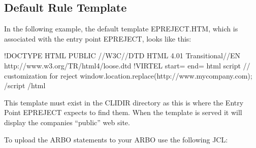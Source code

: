 \documentclass[letterpaper,10pt,english]{sphinxmanual}
\begin{document}
\ignorespaces 

\subsection{Default Rule Template}
\label{\detokenize{connectivity_guide:default-rule-template}}\label{\detokenize{connectivity_guide:index-196}}
\sphinxAtStartPar
In the following example, the default template EPREJECT.HTM, which is associated with the entry point EPREJECT, looks like this:\sphinxhyphen{}

\begin{sphinxVerbatim}[commandchars=\\\{\}]
\PYGZlt{}!DOCTYPE HTML PUBLIC \PYGZdq{}\PYGZhy{}//W3C//DTD HTML 4.01 Transitional//EN\PYGZdq{}
\PYGZdq{}http://www.w3.org/TR/html4/loose.dtd\PYGZdq{}\PYGZgt{}
\PYGZlt{}!\PYGZhy{}\PYGZhy{}VIRTEL start=\PYGZdq{}\PYGZob{}\PYGZob{}\PYGZob{}\PYGZdq{} end=\PYGZdq{}\PYGZcb{}\PYGZcb{}\PYGZcb{}\PYGZdq{} \PYGZhy{}\PYGZhy{}\PYGZgt{}
\PYGZlt{}html\PYGZgt{}
\PYGZlt{}script\PYGZgt{}
// customization for reject
window.location.replace(\PYGZdq{}http://www.mycompany.com\PYGZdq{});
\PYGZlt{}/script\PYGZgt{}
\PYGZlt{}/html\PYGZgt{}
\end{sphinxVerbatim}

\sphinxAtStartPar
This template must exist in the CLI\sphinxhyphen{}DIR directory as this is where the Entry Point EPREJECT expects to find them. When the template is served it will display the companies “public” web site.

\sphinxAtStartPar
To upload the ARBO statements to your ARBO use the following JCL:\sphinxhyphen{}
\end{document}
